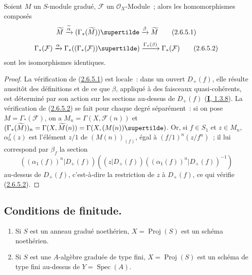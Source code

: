 \begin{proposition}[2.6.5]
\label{II.2.6.5-fr}
Soient $M$ un $S$-module gradué, $\mathcal{F}$ un $\mathcal{O}_X$-Module~;
alors les homomorphismes composés
\[
\label{II.2.6.5.1-fr}
  \widetilde{M}\xrightarrow{\widetilde{\alpha}}
  (\Gamma_*(\widetilde{M}))\supertilde
  \xrightarrow{\beta}\widetilde{M}
\tag{2.6.5.1}
\]
\[
\label{II.2.6.5.2-fr}
  \Gamma_*(\mathcal{F})\xrightarrow{\alpha}
  \Gamma_*((\Gamma_*(\mathcal{F}))\supertilde)
  \xrightarrow{\Gamma_*(\beta)}\Gamma_*(\mathcal{F})
\tag{2.6.5.2}
\]
sont les isomorphismes identiques.
\end{proposition}

\begin{proof}
La vérification de (\hyperref[II.2.6.5.1-fr]{2.6.5.1}) est locale~: dans un
ouvert $D_+(f)$, elle résulte aussitôt des définitions et de ce que $\beta$,
appliqué à des faisceaux quasi-cohérents, est déterminé par son action sur les
sections au-dessus de $D_+(f)$ (\hyperref[I.1.3.8-fr]{\textbf{I}, 1.3.8}). La
vérification de (\hyperref[II.2.6.5.2-fr]{2.6.5.2}) se fait pour chaque degré
séparément~: si on pose $M=\Gamma_*(\mathcal{F})$, on a
$M_n=\Gamma(X,\mathcal{F}(n))$ et
$(\Gamma_*(\widetilde{M}))_n=\Gamma(X,\widetilde{M}(n))
=\Gamma(X,(M(n))\supertilde)$. Or, si $f\in S_1$ et $z\in M_n$,
$\alpha_n^f(z)$ est l'élément $z/1$ de $(M(n))_{(f)}$, égal à
$(f/1)^n(z/f^n)$~; il lui correspond par $\beta_f$ la section
\[
  ((\alpha_1(f))^n|D_+(f))
  ((z|D_+(f))((\alpha_1(f))^n|D_+(f))^{-1})
\]
au-dessus de $D_+(f)$, c'est-à-dire la restriction de $z$ à $D_+(f)$, ce qui
vérifie (\hyperref[II.2.6.5.2-fr]{2.6.5.2}).
\end{proof}

\subsection{Conditions de finitude.}
\label{subsection:II.2.7-fr}

\begin{proposition}[2.7.1]
\label{II.2.7.1-fr}
\begin{enumerate}
  \item[\rm(i)] Si $S$ est un anneau gradué noethérien,
    $X=\operatorname{Proj}(S)$ est un schéma noethérien.
  \item[\rm(ii)] Si $S$ est une $A$-algèbre graduée de type fini,
    $X=\operatorname{Proj}(S)$ est un schéma de type fini au-dessus de
    $Y=\operatorname{Spec}(A)$.
\end{enumerate}
\end{proposition}

